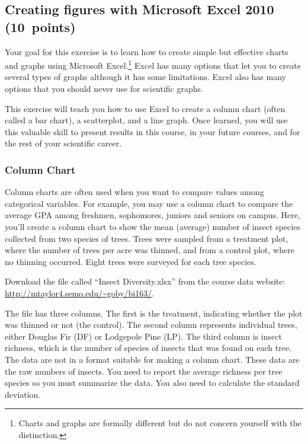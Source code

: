 \documentclass[12pt, hidelinks]{exam}
\newcommand{\hidepoints}{%
	\pointsinmargin\pointformat{}
}
\newcommand{\VSpace}{\vspace{\baselineskip}}
\begin{document}
\hidepoints

\subsection*{Creating figures with Microsoft Excel 2010 (10~points)}

Your goal for this exercise is to learn how to create simple but effective charts and graphs using Microsoft Excel.\footnote{Charts and graphs are formally different but do not concern yourself with the distinction.}  Excel has many options that let you to create several types of graphs although it has some limitations. Excel also has many options that you should never use for scientific graphs. 

This exercise will teach you how to use Excel to create a column chart (often called a bar chart), a scatterplot, and a line graph. Once learned, you will use this valuable skill to present results in this course, in your future courses, and for the rest of your scientific career. 

\subsubsection*{Column Chart}

Column charts are often used when you want to compare values among categorical variables. For example, you may use a column chart to compare the average GPA among freshmen, sophomores, juniors and seniors on campus. Here, you’ll create a column chart to show the mean (average) number of insect species collected from two species of trees. Trees were sampled from a treatment plot, where the number of trees per acre was thinned, and from a control plot, where no thinning occurred. Eight trees were surveyed for each tree species.\VSpace

Download the file called “Insect Diversity.xlsx” from the course data website: \url{http://mtaylor4.semo.edu/~goby/bi163/}.\VSpace

The file has three columns. The first is the treatment, indicating whether the plot was thinned or not (the control). The second column represents individual trees, either Douglas Fir (DF) or Lodgepole Pine (LP). The third column is insect richness, which is the number of species of insects that was found on each tree. The data are not in a format suitable for making a column chart. These data are the raw numbers of insects. You need to report the average richness per tree species so you must summarize the data. You also need to calculate the standard deviation.
\end{document}
